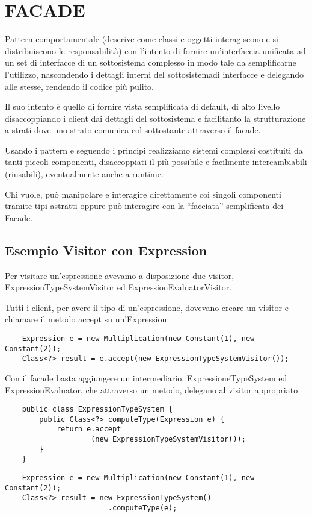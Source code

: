 \chapter{FACADE}

Pattern \underline{comportamentale} (descrive come classi e oggetti interagiscono e si distribuiscono le responsabilità) con l'intento di fornire un'interfaccia 
unificata ad un set di interfacce di un sottosistema complesso in modo tale da semplificarne l'utilizzo, nascondendo i dettagli interni del sottosistemadi 
interfacce e delegando alle stesse, rendendo il codice più pulito.

Il suo intento è quello di fornire vista semplificata di default, di alto livello disaccoppiando i client dai dettagli del sottosistema e facilitanto la 
strutturazione a strati dove uno strato comunica col sottostante attraverso il facade.

Usando i pattern e seguendo i principi realizziamo sistemi complessi costituiti da tanti piccoli componenti, disaccoppiati il più possibile e facilmente 
intercambiabili (riusabili), eventualmente anche a runtime.

Chi vuole, può manipolare e interagire direttamente coi singoli componenti tramite tipi astratti oppure può interagire con la “facciata” semplificata dei Facade.

\section{Esempio Visitor con Expression}

Per visitare un'espressione avevamo a disposizione due visitor, ExpressionTypeSystemVisitor ed ExpressionEvaluatorVisitor.

Tutti i client, per avere il tipo di un’espressione, dovevano creare un visitor e chiamare il metodo accept su un'Expression
\begin{lstlisting}
    Expression e = new Multiplication(new Constant(1), new Constant(2));
    Class<?> result = e.accept(new ExpressionTypeSystemVisitor());
\end{lstlisting}

Con il facade basta aggiungere un intermediario, ExpressioneTypeSystem ed ExpressionEvaluator, che attraverso un metodo, delegano al visitor appropriato
\begin{multicols}{2}
\begin{lstlisting}
    public class ExpressionTypeSystem {
        public Class<?> computeType(Expression e) {
            return e.accept
                    (new ExpressionTypeSystemVisitor());
        }
    }
\end{lstlisting}
\columnbreak
\begin{lstlisting}
    Expression e = new Multiplication(new Constant(1), new Constant(2));
    Class<?> result = new ExpressionTypeSystem()
                        .computeType(e);
\end{lstlisting}
\end{multicols}

